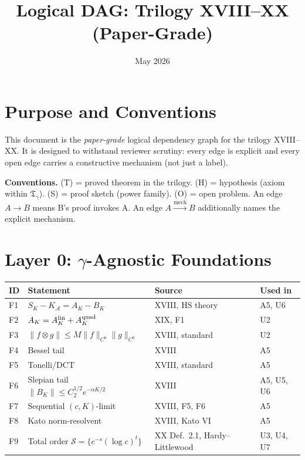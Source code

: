\documentclass[12pt,a4paper]{amsart}
\theoremstyle{definition}
\begin{document}
\title{Logical DAG: Trilogy XVIII--XX (Paper-Grade)}
\date{May 2026}
\maketitle

\tableofcontents

\section{Purpose and Conventions}
\label{sec:purpose}

This document is the \emph{paper-grade} logical dependency graph
for the trilogy XVIII--XX.
It is designed to withstand reviewer scrutiny: every edge is
explicit and every open edge carries a constructive mechanism
(not just a label).

\medskip
\textbf{Conventions.}
(T) = proved theorem in the trilogy.
(H) = hypothesis (axiom within $\mathfrak{T}_\gamma$).
(S) = proof sketch (power family).
(O) = open problem.
An edge $A\to B$ means B's proof invokes A.
An edge $A\xrightarrow{\text{mech}}B$ additionally names
the explicit mechanism.

\section{Layer 0: $\gamma$-Agnostic Foundations}
\label{sec:L0}

\begin{center}
\renewcommand{\arraystretch}{1.3}
\begin{tabular}{l l l l}
\toprule
\textbf{ID} & \textbf{Statement} & \textbf{Source} & \textbf{Used in} \\
\midrule
F1 & $S_K - K_{\mathcal{A}} = A_K - B_K$ & XVIII, HS theory
  & A5, U6 \\
F2 & $A_K = A_K^{\rm lin} + A_K^{\rm quad}$ & XIX, F1
  & U2 \\
F3 & $\|f\otimes g\|\leq M\|f\|_{C^0}\|g\|_{C^0}$ & XVIII, standard
  & U2 \\
F4 & Bessel tail & XVIII & A5 \\
F5 & Tonelli/DCT & XVIII, standard & A5 \\
F6 & Slepian tail $\|B_K\|\leq C_2^{1/2}e^{-\alpha K/2}$ & XVIII
  & A5, U5, U6 \\
F7 & Sequential $(c,K)$-limit & XVIII, F5, F6 & A5 \\
F8 & Kato norm-resolvent & XVIII, Kato VI & A5 \\
F9 & Total order $\mathcal{S} = \{c^{-s}(\log c)^t\}$
  & XX Def.~2.1, Hardy--Littlewood
  & U3, U4, U7 \\
\bottomrule
\end{tabular}
\end{center}
\end{document}
